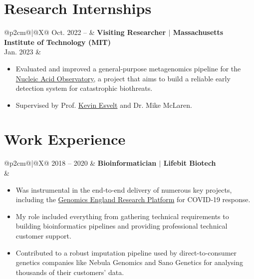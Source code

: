 \documentclass[letterpaper,11pt]{article}
\begin{document}
\section{\textbf{Research Internships}}
\begin{tabularx}{\linewidth}{@{}p{2cm}@{\hspace{5pt}}|@{\hspace{5pt}}X@{}}
    Oct. 2022 -- & 
    \textbf{Visiting Researcher $|$ Massachusetts Institute of Technology (MIT)} \\
    Jan. 2023 & \begin{minipage}[t]{\linewidth}
        \begin{itemize}[noitemsep]
            \item Evaluated and improved a general‐purpose metagenomics pipeline for the \href{https://naobservatory.org/}{\color{teal}Nucleic Acid Observatory}, a project that aims to build a reliable early detection system for catastrophic biothreats.
            \item Supervised by Prof. \href{https://www.media.mit.edu/people/esvelt/overview/}{\color{teal}Kevin Esvelt} and Dr. Mike McLaren.
        \end{itemize}
    \end{minipage}
\end{tabularx}



\section{\textbf{Work Experience}}
\vspace{3pt}
\begin{tabularx}{\linewidth}{@{}p{2cm}@{\hspace{5pt}}|@{\hspace{5pt}}X@{}}
  2018 -- 2020 & 
  \textbf{Bioinformatician $|$ Lifebit Biotech} \\
  & \begin{minipage}[t]{\linewidth}
      \begin{itemize}[noitemsep]
          \item Was instrumental in the end‐to‐end delivery of numerous key projects, including the \href{https://www.genomicsengland.co.uk/news/research-environment-covid-19-lifebit-aws}{\color{teal}Genomics England Research Platform} for COVID‐19 response.
          \item My role included everything from gathering technical requirements to building bioinformatics pipelines and providing professional technical customer support.
          \item Contributed to a robust imputation pipeline used by direct-to-consumer genetics companies like Nebula Genomics and Sano Genetics for analysing thousands of their customers' data.
      \end{itemize}
  \end{minipage}
\end{tabularx}
\end{document}

